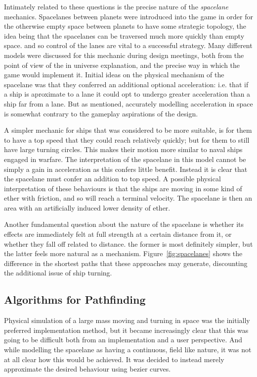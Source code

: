 Intimately related to these questions is the precise nature of the \emph{spacelane} mechanics. Spacelanes between planets were introduced into the game in order for the otherwise empty space between planets to have some strategic topology, the idea being that the spacelanes can be traversed much more quickly than empty space. and so control of the lanes are vital to a successful strategy. Many different models were discussed for this mechanic during design meetings, both from the point of view of the in universe explanation, and the precise way in which the game would implement it. Initial ideas on the physical mechanism of the spacelane was that they conferred an additional optional acceleration: i.e. that if a ship is aproximate to a lane it could opt to undergo greater acceleration than a ship far from a lane. But as mentioned, accurately modelling acceleration in space is somewhat contrary to the gameplay aspirations of the design. 

A simpler mechanic for ships that was considered to be more suitable, is for them to have a top speed that they could reach relatively quickly; but for them to still have large turning circles. This makes their motion more similar to naval ships engaged in warfare. The interpretation of the spacelane in this model cannot be simply a gain in acceleration as this confers little benefit. Instead it is clear that the spacelane must confer an addition to top speed. A possible physical interpretation of these behaviours is that the ships are moving in some kind of ether with friction, and so will reach a terminal velocity. The spacelane is then an area with an artificially induced lower density of ether.

Another fundamental question about the nature of the spacelane is whether its effects are immediately felt at full strength at a certain distance from it, or whether they fall off related to distance. the former is most definitely simpler, but the latter feels more natural as a mechanism. Figure~\ref{fig:spacelanes} shows the difference in the shortest paths that these approaches may generate, discounting the additional issue of ship turning.

\subsection{Algorithms for Pathfinding}

Physical simulation of a large mass moving and turning in space was the initially preferred implementation method, but it became increasingly clear that this was going to be difficult both from an implementation and a user perspective. And while modelling the spacelane as having a continuous, field like nature, it was not at all clear how this would be achieved. It was decided to instead merely approximate the desired behaviour using bezier curves.

